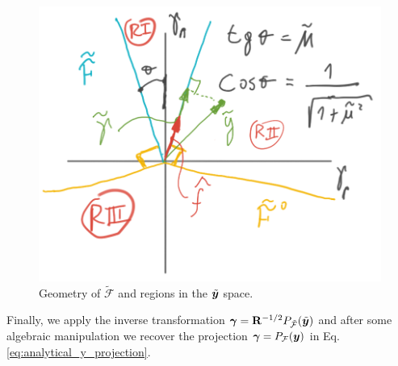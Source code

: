\begin{figure}[!h]
    \centering
    \includegraphics[width=0.45\columnwidth]{figures/cone_regions.png}
    \caption{Geometry of $\tilde{\mathcal{F}}$ and regions in the
    $\tilde{{\bm{y}}}$ space.}
    \label{fig:cone_regions}
\end{figure}

Finally, we apply the inverse transformation
${\bm\gamma}={\mathbf{R}}^{-1/2}P_{\tilde{\mathcal{F}}}(\tilde{{\bm{y}}})$ and after some
algebraic manipulation we recover the projection ${\bm\gamma} =
P_\mathcal{F}({\bm{y}})$ in Eq. \eqref{eq:analytical_y_projection}.


